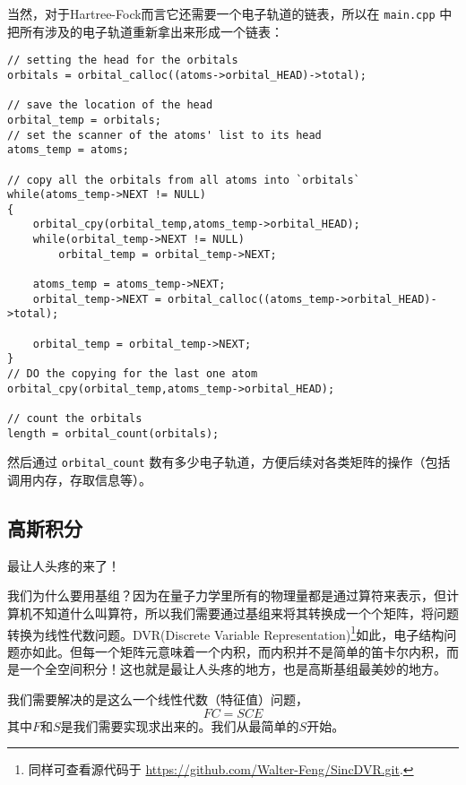 \documentclass[12pt,a4paper,openany,twoside]{article}
\numberwithin{equation}{section}
\begin{document}
            当然，对于Hartree-Fock而言它还需要一个电子轨道的链表，所以在 \lstinline$main.cpp$ 中把所有涉及的电子轨道重新拿出来形成一个链表：

            \begin{lstlisting}
// setting the head for the orbitals 
orbitals = orbital_calloc((atoms->orbital_HEAD)->total);

// save the location of the head
orbital_temp = orbitals;
// set the scanner of the atoms' list to its head
atoms_temp = atoms;

// copy all the orbitals from all atoms into `orbitals`
while(atoms_temp->NEXT != NULL)
{
    orbital_cpy(orbital_temp,atoms_temp->orbital_HEAD);
    while(orbital_temp->NEXT != NULL)
        orbital_temp = orbital_temp->NEXT;

    atoms_temp = atoms_temp->NEXT;
    orbital_temp->NEXT = orbital_calloc((atoms_temp->orbital_HEAD)->total);

    orbital_temp = orbital_temp->NEXT;
}
// DO the copying for the last one atom
orbital_cpy(orbital_temp,atoms_temp->orbital_HEAD);

// count the orbitals
length = orbital_count(orbitals);
            \end{lstlisting}
            然后通过 \lstinline$orbital_count$ 数有多少电子轨道，方便后续对各类矩阵的操作（包括调用内存，存取信息等）。
            \subsection{高斯积分}
            最让人头疼的来了！

            我们为什么要用基组？因为在量子力学里所有的物理量都是通过算符来表示，但计算机不知道什么叫算符，所以我们需要通过基组来将其转换成一个个矩阵，将问题转换为线性代数问题。DVR(Discrete Variable Representation)\footnote{同样可查看源代码于 \url{https://github.com/Walter-Feng/SincDVR.git}.}如此，电子结构问题亦如此。但每一个矩阵元意味着一个内积，而内积并不是简单的笛卡尔内积，而是一个全空间积分！这也就是最让人头疼的地方，也是高斯基组最美妙的地方。

            我们需要解决的是这么一个线性代数（特征值）问题，
            \begin{equation}
                F C = S C E
            \end{equation}
            其中$F$和$S$是我们需要实现求出来的。我们从最简单的$S$开始。
\end{document}
